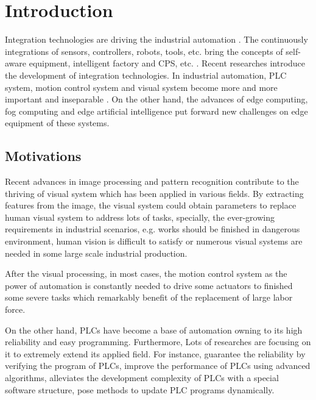 \documentclass[journal,UTF8]{IEEEtran}
\begin{document}
\section{Introduction}
Integration technologies are driving the industrial automation \cite{Kazmierkowski2007Integration}. The continuously integrations of sensors, controllers, robots, tools, etc. bring the concepts of self-aware equipment, intelligent factory and CPS, etc. \cite{Wan2018An,Chekired2018Industrial}. Recent researches \cite{Colombo2006An,Vaccaro2010An,Dean2017Integration} introduce the development of integration technologies. In industrial automation, PLC system,  motion control system and visual system become more and more important and inseparable \cite{Feng2002Integrating,Chang2006Motion,Feng2005Practical}. On the other hand, the advances of edge computing, fog computing and edge artificial intelligence \cite{Hu2017Fog,Hou2018Green,PaceAn} put forward new challenges on edge equipment of these systems.

\subsection{Motivations}
Recent advances in image processing and pattern recognition contribute to the thriving of visual system which has been applied in various fields. By extracting features from the image, the visual system could obtain parameters to replace human visual system to address lots of tasks, specially, the ever-growing requirements in industrial scenarios, e.g. works should be finished in dangerous environment, human vision is difficult to satisfy or numerous visual systems are needed in some large scale industrial production. 

After the visual processing, in most cases, the motion control system as the power of automation is constantly needed to drive some actuators to finished some severe tasks which remarkably benefit of the replacement of large labor force. 

On the other hand, PLCs have become a base of automation owning to its high reliability and easy programming\cite{Hossain2014Advanced}. Furthermore, Lots of researches are focusing on it to extremely extend its applied field. For instance, \cite{Jiang2013System,Jiang2013Bayesian} guarantee the reliability by verifying the program of PLCs, \cite{Gerk2006Advanced,Dominic2016PLC} improve the performance of PLCs using advanced algorithms, \cite{wu2018customized} alleviates the development complexity of PLCs with a special software structure, \cite{Sch2013Development} pose methods to update PLC programs dynamically.
\end{document}
